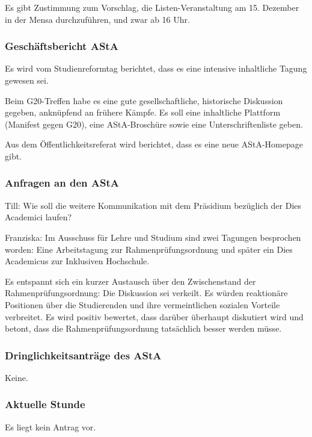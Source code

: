 \documentclass[ngerman,headheight=70pt]{scrartcl}
\begin{document}
    Es gibt Zustimmung zum Vorschlag, die Listen-Veranstaltung am 15. Dezember
    in der Mensa durchzuführen, und zwar ab 16 Uhr.

    \subsubsection{Geschäftsbericht AStA}

    Es wird vom Studienreformtag berichtet, dass es eine intensive inhaltliche
    Tagung gewesen sei.

    Beim G20-Treffen habe es eine gute gesellschaftliche, historische Diskussion
    gegeben, anknüpfend an frühere Kämpfe. Es soll eine inhaltliche Plattform
    (Manifest gegen G20), eine AStA-Broschüre sowie eine Unterschriftenliste
    geben.

    Aus dem Öffentlichkeitsreferat wird berichtet, dass es eine neue AStA-Homepage
    gibt.

    \subsubsection{Anfragen an den AStA}

    Till: Wie soll die weitere Kommunikation mit dem Präsidium bezüglich der Dies
    Academici laufen?

    Franziska: Im Ausschuss für Lehre und Studium sind zwei Tagungen besprochen
    worden: Eine Arbeitstagung zur Rahmenprüfungsordnung und später ein Dies
    Academicus zur Inklusiven Hochschule.

    Es entspannt sich ein kurzer Austausch über den Zwischenstand der
    Rahmenprüfungsordnung: Die Diskussion sei verkeilt. Es würden reaktionäre
    Positionen über die Studierenden und ihre vermeintlichen sozialen Vorteile
    verbreitet. Es wird positiv bewertet, dass darüber überhaupt diskutiert wird
    und betont, dass die Rahmenprüfungsordnung tatsächlich besser werden müsse.


    \subsubsection{Dringlichkeitsanträge des AStA}

    Keine.

    \subsubsection{Aktuelle Stunde}

    Es liegt kein Antrag vor.
\end{document}
